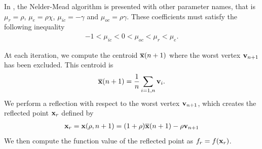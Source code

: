 In \cite{Kelley1999}, the Nelder-Mead algorithm is presented with 
other parameter names, that is $\mu_r = \rho$, $\mu_e = \rho\chi$, $\mu_{ic} = -\gamma$
and $\mu_{oc} = \rho\gamma$. These coefficients must satisfy the following 
inequality 
\begin{eqnarray}
-1 < \mu_{ic} < 0 < \mu_{oc} < \mu_r < \mu_e.
\end{eqnarray}

At each iteration, we compute the centroid 
$\overline{\mathbf{x}} (n+1)$ where the worst vertex $\mathbf{v}_{n+1}$ 
has been excluded. This centroid is 
\begin{eqnarray}
\label{centroid-worst}
\overline{\mathbf{x}} (n+1) = \frac{1}{n} \sum_{i=1,n} \mathbf{v}_i.
\end{eqnarray}
We perform a reflection with respect to the worst vertex $\mathbf{v}_{n+1}$,
which creates the reflected point $\mathbf{x}_r$ defined by 
\begin{eqnarray}
\label{interpolate-worst}
\mathbf{x}_r = \mathbf{x}(\rho,n+1) = (1+\rho)\overline{\mathbf{x}}(n+1) - \rho \mathbf{v}_{n+1}
\end{eqnarray}
We then compute the function value of the reflected
point as $f_r=f(\mathbf{x}_r)$. 

